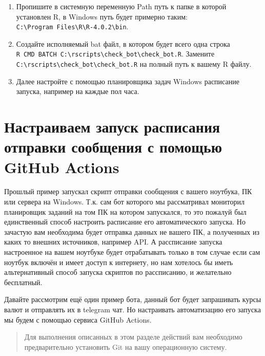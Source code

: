 \documentclass[
]{book}
\providecommand{\tightlist}{%
  \setlength{\itemsep}{0pt}\setlength{\parskip}{0pt}}
\begin{document}
\begin{enumerate}
\def\labelenumi{\arabic{enumi}.}
\tightlist
\item
  Пропишите в системную переменную Path путь к папке в которой установлен R, в Windows путь будет примерно таким: \texttt{C:\textbackslash{}Program\ Files\textbackslash{}R\textbackslash{}R-4.0.2\textbackslash{}bin}.
\item
  Создайте исполняемый bat файл, в котором будет всего одна строка \texttt{R\ CMD\ BATCH\ C:\textbackslash{}rscripts\textbackslash{}check\_bot\textbackslash{}check\_bot.R}. Замените \texttt{C:\textbackslash{}rscripts\textbackslash{}check\_bot\textbackslash{}check\_bot.R} на полный путь к вашему R файлу.
\item
  Далее настройте с помощью планировщика задач Windows расписание запуска, например на каждые пол часа.
\end{enumerate}

\section{Настраиваем запуск расписания отправки сообщения с помощью GitHub Actions}\label{ux43dux430ux441ux442ux440ux430ux438ux432ux430ux435ux43c-ux437ux430ux43fux443ux441ux43a-ux440ux430ux441ux43fux438ux441ux430ux43dux438ux44f-ux43eux442ux43fux440ux430ux432ux43aux438-ux441ux43eux43eux431ux449ux435ux43dux438ux44f-ux441-ux43fux43eux43cux43eux449ux44cux44e-github-actions}

Прошлый пример запускал скрипт отправки сообщения с вашего ноутбука, ПК или сервера на Windows. Т.к. сам бот которого мы рассматривал мониторил планировщик заданий на том ПК на котором запускался, то это пожалуй был единственный способ настроить расписание его автоматического запуска. Но зачастую вам необходима будет отправка данных не вашего ПК, а полученных из каких то внешних источников, например API. А рассписание запуска настроенное на вашем ноутбуке будет отрабатывать только в том случае если сам ноутбук включён и имеет доступ к интернету, но нам хотелось бы иметь альтернативный способ запуска скриптов по рассписанию, и желательно бесплатный.

Давайте рассмотрим ещё один пример бота, данный бот будет запрашивать курсы валют и отправлять их в telegram чат. Но настраивать автоматизацию его запуска мы будем с помощью сервиса GitHub Actions.

\begin{quote}
Для выполнения описанных в этом разделе действий вам необходимо предварительно установить Git на вашу операционную систему.
\end{quote}
\end{document}
